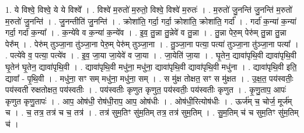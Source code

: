 \documentclass[17pt]{extarticle}
\begin{document}
1. ये विश्वे॒ विश्वे॒ ये ये विश्वे᳚ । . विश्वे॑ म॒रुतो॑ म॒रुतो॒ विश्वे॒ विश्वे॑ म॒रुतः॑ । . म॒रुतो॑ जु॒नन्ति॑ जु॒नन्ति॑ म॒रुतो॑ म॒रुतो॑ जु॒नन्ति॑ । . जु॒नन्तीति॑ जु॒नन्ति॑ । . क्रोशा॑ति॒ गर्दा॒ गर्दा॒ क्रोशा॑ति॒ क्रोशा॑ति॒ गर्दा᳚ । . गर्दा॑ क॒न्या॑ क॒न्या॑ गर्दा॒ गर्दा॑ क॒न्या᳚ । . क॒न्ये॑वे व क॒न्या॑ क॒न्ये॑व । . इ॒व॒ तु॒न्ना तु॒न्नेवे॑ व तु॒न्ना । . तु॒न्ना पेरु॒म् पेरु॑म् तु॒न्ना तु॒न्ना पेरु᳚म् । . पेरु॑म् तुञ्जा॒ना तु॑ञ्जा॒ना पेरु॒म् पेरु॑म् तुञ्जा॒ना । . तु॒ञ्जा॒ना पत्या॒ पत्या॑ तुञ्जा॒ना तु॑ञ्जा॒ना पत्या᳚ । . पत्ये॑वे व॒ पत्या॒ पत्ये॑व । . इ॒व॒ जा॒या जा॒येवे॑ व जा॒या । . जा॒येति॑ जा॒या । . घृ॒तेन॒ द्यावा॑पृथि॒वी द्यावा॑पृथि॒वी घृ॒तेन॑ घृ॒तेन॒ द्यावा॑पृथि॒वी । . द्यावा॑पृथि॒वी मधु॑ना॒ मधु॑ना॒ द्यावा॑पृथि॒वी द्यावा॑पृथि॒वी मधु॑ना । . द्यावा॑पृथि॒वी इति॒ द्यावा᳚ - पृ॒थि॒वी । . मधु॑ना॒ सꣳ सम् मधु॑ना॒ मधु॑ना॒ सम् । . स मु॑क्ष तोक्षत॒ सꣳ स मु॑क्षत । . उ॒क्ष॒त॒ पय॑स्वतीः॒ पय॑स्वती रुक्षतोक्षत॒ पय॑स्वतीः । . पय॑स्वतीः कृणुत कृणुत॒ पय॑स्वतीः॒ पय॑स्वतीः कृणुत । . कृ॒णु॒ताप॒ आपः॑ कृणुत कृणु॒तापः॑ । . आप॒ ओष॑धी॒ रोष॑धी॒राप॒ आप॒ ओष॑धीः । . ओष॑धी॒रित्योष॑धीः । . ऊर्ज॑म् च॒ चोर्ज॒ मूर्ज॑म् च । . च॒ तत्र॒ तत्र॑ च च॒ तत्र॑ । . तत्र॑ सुम॒तिꣳ सु॑म॒तिम् तत्र॒ तत्र॑ सुम॒तिम् । . सु॒म॒तिम् च॑ च सुम॒तिꣳ सु॑म॒तिम् च॑ । \newline
\end{document}
